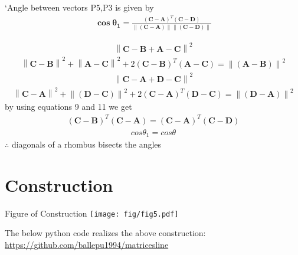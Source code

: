 \documentclass[10pt, a4paper]{article}
\providecommand{\norm}[1]{\left\lVert#1\right\rVert}
\let\vec\mathbf
\begin{document}
  
 \vspace{3mm}
 `Angle between vectors P5,P3 is given by \\
 \begin{align}
\vec{\cos \theta_1} =\frac{\vec{(C-A)}^T  \vec{(C-D)}}{\norm{\vec{(C-A)}}\norm{\vec{(C-D)}}}
 \end{align}

 \begin{align}                                                \norm{\vec{C-B+A-C}}^2
 \end{align} 
 \begin{align}     
	 \norm{\vec{C-B}}^2+\norm{\vec{A-C}}^2+2\vec{(C-B)}^T\vec{(A-C)}=\norm{\vec{(A-B)}}^2
 \end{align}
\begin{align}
	\norm{\vec{C-A+D-C}}^2
\end{align} 
\begin{align}
	\norm{\vec{C-A}}^2+\norm{\vec{(D-C)}}^2+2\vec{(C-A)}^T\vec{(D-C)}=\norm{\vec{(D-A)}}^2
\end{align}
by using equations 9 and 11 we get\\
\begin{align}
\vec{(C-B)}^T\vec{(C-A)}=\vec{(C-A)}^T\vec{(C-D)}
\end{align}	
\begin{align}
cos\theta_1 =cos\theta
\end{align}
$\therefore$ diagonals of a rhombus bisects the angles\\

 \section{Construction}
 	\begin{center}
     Figure of Construction
 \texttt{[image: fig/fig5.pdf]} 
  	\end{center}
  	\vspace{1mm}
The below python code realizes the above construction:	\\
\url{https://github.com/ballepu1994/matricesline}

\end{document}
